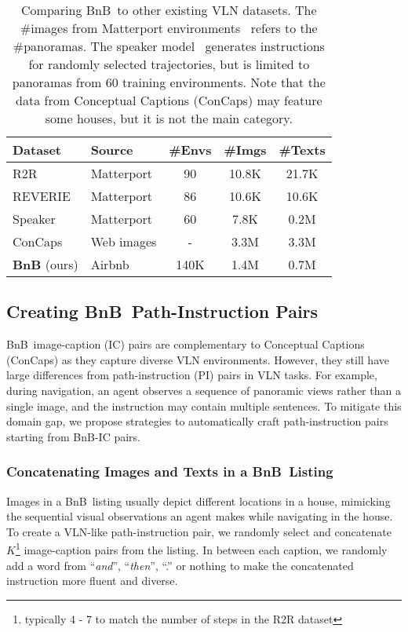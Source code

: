 \RequirePackage[dvipsnames,table]{xcolor} \documentclass[10pt,twocolumn,letterpaper]{article}
\newcommand{\airbnb}{BnB}
\begin{document}
\begin{table}[t]
\centering
\tabcolsep=0.11cm
\small
\begin{tabular}{ll ccc}
\toprule
Dataset & Source & \#Envs & \#Imgs & \#Texts \\
\midrule
R2R~\cite{anderson2018r2r} & Matterport    & 90 & 10.8K & 21.7K \\
REVERIE~\cite{qi2020reverie} & Matterport  & 86 & 10.6K & 10.6K \\
Speaker~\cite{tan2019envdrop} & Matterport & 60 & 7.8K & 0.2M \\
\midrule
ConCaps~\cite{ConceptualCaptions} & Web images & - & 3.3M & 3.3M \\
\textbf{\airbnb} (ours) & Airbnb & 140K & 1.4M & 0.7M \\
\bottomrule
\end{tabular}
\vspace{-2mm}
\caption{Comparing \airbnb~to other existing VLN datasets.
The \#images from Matterport environments~\cite{Matterport3D} refers to the \#panoramas.
The speaker model~\cite{tan2019envdrop} generates instructions for randomly selected trajectories, but is limited to panoramas from 60 training environments.
Note that the data from Conceptual Captions (ConCaps) may feature some houses, but it is not the main category.
}
\vspace{-4mm}
\label{tab:bnb_dataset_cmpr}
\end{table}
 
\subsection{Creating \airbnb~Path-Instruction Pairs}
\label{sec:create_pi_pairs}
\airbnb~image-caption (IC) pairs are complementary to Conceptual Captions (ConCaps) as they capture diverse VLN environments.
However, they still have large differences from path-instruction (PI) pairs in VLN tasks.
For example, during navigation, an agent observes a sequence of panoramic views rather than a single image, and the instruction may contain multiple sentences.
To mitigate this domain gap, we propose strategies to automatically craft path-instruction pairs starting from \airbnb-IC pairs.

\subsubsection{Concatenating Images and Texts in a \airbnb~Listing}
\label{sec:concate_method}
Images in a \airbnb~listing usually depict different locations in a house, mimicking the sequential visual observations an agent makes while navigating in the house.
To create a VLN-like path-instruction pair,  we randomly select and concatenate $K$\footnote{typically 4 - 7 to match the number of steps in the R2R dataset} image-caption pairs from the listing.
In between each caption, we randomly add a word from ``\emph{and}'', ``\emph{then}'', ``.'' or nothing to make the concatenated instruction more fluent and diverse.
\end{document}
